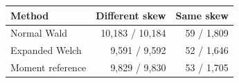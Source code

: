 \begin{tabular}{@{}lrr@{}}
\toprule
Method & Different skew & Same skew\\
\midrule
Normal Wald & 10,183 / 10,184 & 59 / 1,809\\
Expanded Welch & 9,591 / 9,592 & 52 / 1,646\\
Moment reference & 9,829 / 9,830 & 53 / 1,705\\
\bottomrule
\end{tabular}
